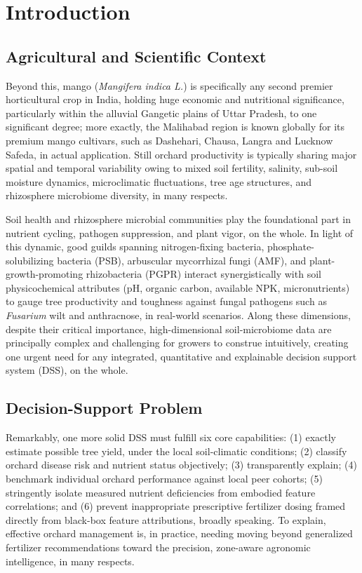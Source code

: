 \documentclass[runningheads,a4paper,oribibl]{llncs}
\begin{document}
\section{Introduction}

\subsection{Agricultural and Scientific Context}
Beyond this, mango (\textit{Mangifera indica L.}) is specifically any second premier horticultural crop in India, holding huge economic and nutritional significance, particularly within the alluvial Gangetic plains of Uttar Pradesh, to one significant degree; more exactly, the Malihabad region is known globally for its premium mango cultivars, such as Dashehari, Chausa, Langra and Lucknow Safeda\cite{mukherjee1953,kulkarni2004,litz2009}, in actual application. Still orchard productivity is typically sharing major spatial and temporal variability owing to mixed soil fertility, salinity, sub-soil moisture dynamics, microclimatic fluctuations\cite{bouskill2013}, tree age structures, and rhizosphere microbiome diversity\cite{singh2020}, in many respects.

Soil health and rhizosphere microbial communities play the foundational part in nutrient cycling, pathogen suppression, and plant vigor, on the whole\cite{vanderheijden2008,berendsen2012,mendes2011,trivedi2016,compant2019}. In light of this dynamic, good guilds spanning nitrogen-fixing bacteria, phosphate-solubilizing bacteria (PSB), arbuscular mycorrhizal fungi (AMF), and plant-growth-promoting rhizobacteria (PGPR) interact synergistically with soil physicochemical attributes (pH, organic carbon, available NPK, micronutrients) to gauge tree productivity and toughness against fungal pathogens such as \textit{Fusarium} wilt and anthracnose\cite{raaijmakers2009,philippot2013}, in real-world scenarios. Along these dimensions, despite their critical importance, high-dimensional soil-microbiome data are principally complex and challenging\cite{fierer2017,bahram2018,bardgett2014} for growers to construe intuitively, creating one urgent need for any integrated, quantitative and explainable decision support system (DSS), on the whole.

\subsection{Decision-Support Problem}
Remarkably, one more solid DSS must fulfill six core capabilities: (1) exactly estimate possible tree yield, under the local soil-climatic conditions; (2) classify orchard disease risk and nutrient status objectively; (3) transparently explain; (4) benchmark individual orchard performance against local peer cohorts; (5) stringently isolate measured nutrient deficiencies from embodied feature correlations; and (6) prevent inappropriate prescriptive fertilizer dosing framed directly from black-box feature attributions, broadly speaking. To explain, effective orchard management is, in practice, needing moving beyond generalized fertilizer recommendations toward the precision, zone-aware agronomic intelligence\cite{wolfert2017,gebbers2010}, in many respects.
\end{document}
